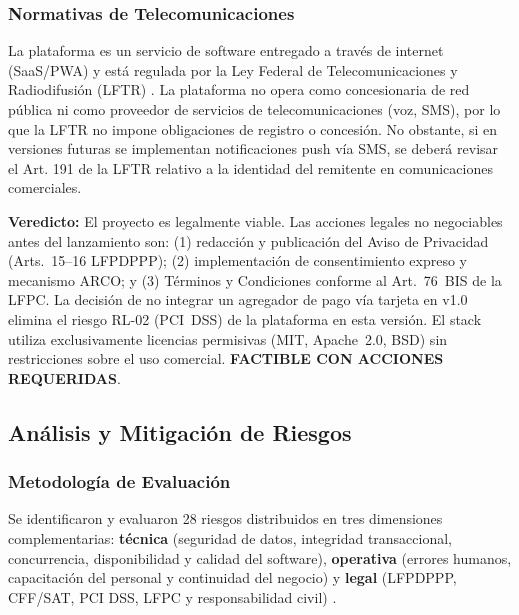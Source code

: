 \subsubsection{Normativas de Telecomunicaciones}

La plataforma es un servicio de software entregado a través de internet (SaaS/PWA)
y está regulada por la Ley Federal de Telecomunicaciones y Radiodifusión (LFTR) \cite{supabase_license}.
La plataforma no opera como concesionaria de red pública ni como proveedor de
servicios de telecomunicaciones (voz, SMS), por lo que la LFTR no impone
obligaciones de registro o concesión. No obstante, si en versiones futuras se
implementan notificaciones push vía SMS, se deberá revisar el Art. 191 de la
LFTR relativo a la identidad del remitente en comunicaciones comerciales.

\noindent\textbf{Veredicto:} El proyecto es legalmente viable. Las acciones legales
no negociables antes del lanzamiento son: (1) redacci\'on y publicaci\'on del Aviso de
Privacidad (Arts.~15--16 LFPDPPP); (2) implementaci\'on de consentimiento expreso y
mecanismo ARCO; y (3) T\'erminos y Condiciones conforme al Art.~76~BIS de la LFPC.
La decisi\'on de no integrar un agregador de pago v\'ia tarjeta en v1.0 elimina el riesgo
RL-02 (PCI~DSS) de la plataforma en esta versi\'on. El stack utiliza exclusivamente
licencias permisivas (MIT, Apache~2.0, BSD) sin restricciones sobre el uso comercial.
\textbf{FACTIBLE CON ACCIONES REQUERIDAS}.

\subsection{Análisis y Mitigación de Riesgos}

\subsubsection{Metodología de Evaluación}

Se identificaron y evaluaron 28 riesgos distribuidos en tres dimensiones complementarias:
\textbf{técnica} (seguridad de datos, integridad transaccional, concurrencia, disponibilidad
y calidad del software), \textbf{operativa} (errores humanos, capacitación del personal y
continuidad del negocio) y \textbf{legal} (LFPDPPP, CFF/SAT, PCI DSS, LFPC y
responsabilidad civil) \cite{covermanager_pricing, lfpdppp, conasami_2024, sat_pac}.

